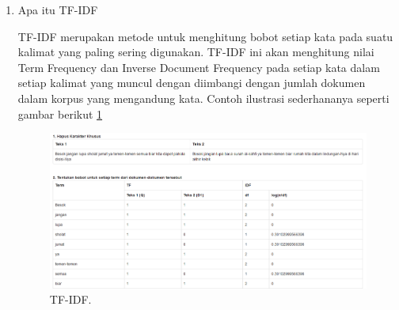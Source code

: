 \begin{enumerate}
\item Apa itu TF-IDF \par
TF-IDF merupakan metode untuk menghitung bobot setiap kata pada suatu kalimat yang paling sering digunakan. TF-IDF ini akan menghitung nilai Term Frequency dan Inverse Document Frequency pada setiap kata dalam setiap kalimat yang muncul dengan diimbangi dengan jumlah dokumen dalam korpus yang mengandung kata. Contoh ilustrasi sederhananya seperti gambar berikut \ref{Teks6}
		\begin{figure}[ht]
		\centerline{\includegraphics[width=1\textwidth]{figures/im/teks6.png}}
		\caption{TF-IDF.}
		\label{Teks6}
		\end{figure}
\end{enumerate}